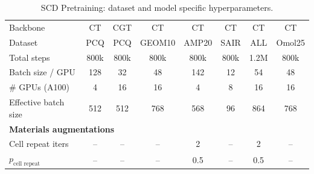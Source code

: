 \begin{table}[t]
\centering
\caption{SCD Pretraining: dataset and model specific hyperparameters.}
\label{tab:scd_pretrain_hparams}
\begin{tabular}{lccccccc}
\toprule
\midrule
Backbone            & CT  & CGT & CT & CT & CT & CT & CT \\
Dataset             & PCQ & PCQ & GEOM10 & AMP20 & SAIR & ALL & Omol25 \\
Total steps         & 800k & 800k & 800k & 800k & 800k & 1.2M & 800k \\
Batch size / GPU    & 128 & 32 & 48 & 142 & 12 & 54 & 48 \\
\# GPUs (A100)      & 4 & 16 & 16 & 4 & 8 & 16 & 16 \\
Effective batch size& 512 & 512 & 768 & 568 & 96 & 864 & 768 \\
\midrule
\multicolumn{8}{l}{\textbf{Materials augmentations}} \\
Cell repeat iters   & -- & -- & -- & 2 & -- & 2 & -- \\
$p_{\text{cell repeat}}$ & -- & -- & -- & 0.5 & -- & 0.5 & -- \\
\bottomrule
\end{tabular}
\end{table}





